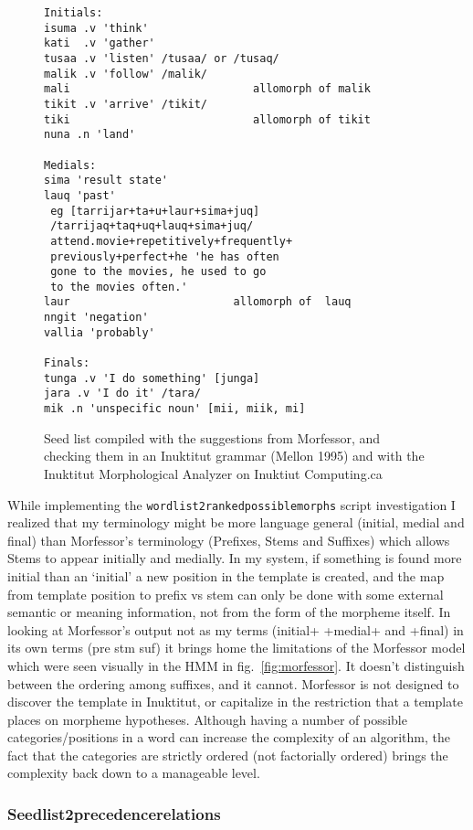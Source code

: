 \documentclass[runningheads,a4paper]{llncs}
\begin{document}
\begin{figure}[htb]
\begin{verbatim}
Initials:
isuma .v 'think'
kati  .v 'gather'
tusaa .v 'listen' /tusaa/ or /tusaq/
malik .v 'follow' /malik/
mali							allomorph of malik
tikit .v 'arrive' /tikit/
tiki							allomorph of tikit
nuna .n 'land'

Medials: 
sima 'result state'
lauq 'past'
 eg [tarrijar+ta+u+laur+sima+juq] 
 /tarrijaq+taq+uq+lauq+sima+juq/ 
 attend.movie+repetitively+frequently+
 previously+perfect+he 'he has often 
 gone to the movies, he used to go 
 to the movies often.'
laur 						 allomorph of  lauq 
nngit 'negation' 
vallia 'probably'

Finals:
tunga .v 'I do something' [junga]
jara .v 'I do it' /tara/
mik .n 'unspecific noun' [mii, miik, mi]
\end{verbatim}
	\caption{Seed list compiled with the suggestions from Morfessor, and checking them in an Inuktitut grammar (Mellon 1995) and with the Inuktitut Morphological Analyzer on Inuktiut Computing.ca}
	\label{fig:seedlist}
\end{figure}

While implementing the {\tt wordlist2rankedpossiblemorphs} script investigation I realized that my terminology might be more language general (initial, medial and final) than Morfessor's terminology (Prefixes, Stems and Suffixes) which allows Stems to appear initially and medially. In my system, if something is found more initial than an `initial' a new position in the template is created, and the map from template position to prefix vs stem can only be done with some external semantic or meaning information, not from the form of the morpheme itself. In looking at Morfessor's output not as my terms (initial+ +medial+ and +final) in its own terms (pre stm suf) it brings home the limitations of the Morfessor model which were seen visually in the HMM in fig.~\ref{fig:morfessor}. It doesn't distinguish between the ordering among suffixes, and it cannot. Morfessor is not designed to discover the template in Inuktitut, or capitalize in the restriction that a template  places on morpheme hypotheses. Although having a number of possible categories/positions in a word can increase the complexity of an algorithm, the fact that the categories are strictly ordered (not factorially ordered) brings the complexity back down to a manageable level.

\subsubsection{Seedlist2precedencerelations}
\end{document}
